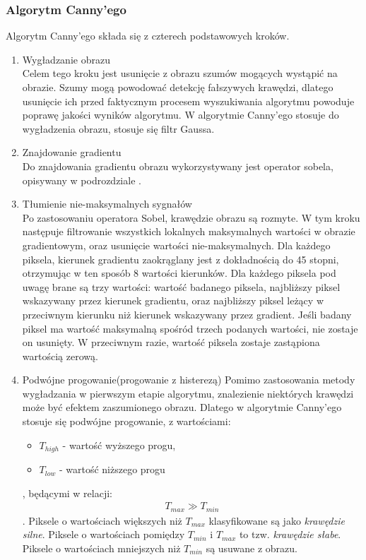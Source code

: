 \subsubsection{Algorytm Canny'ego}
Algorytm Canny'ego składa się z czterech podstawowych kroków.
\begin{enumerate}
\item Wygładzanie obrazu \\
  Celem tego kroku jest usunięcie z obrazu szumów mogących wystąpić na obrazie. Szumy mogą powodować detekcję fałszywych krawędzi, dlatego usunięcie ich przed faktycznym procesem wyszukiwania algorytmu powoduje poprawę jakości wyników algorytmu. W algorytmie Canny'ego stosuje do wygładzenia obrazu, stosuje się filtr Gaussa. 
\item Znajdowanie gradientu \\
  Do znajdowania gradientu obrazu wykorzystywany jest operator sobela, opisywany w podrozdziale .
\item Tłumienie nie-maksymalnych sygnałów \\
  Po zastosowaniu operatora Sobel, krawędzie obrazu są rozmyte. W tym kroku następuje filtrowanie wszystkich lokalnych maksymalnych wartości w obrazie gradientowym, oraz usunięcie wartości nie-maksymalnych. Dla każdego piksela, kierunek gradientu zaokrąglany jest z dokładnością do 45 stopni, otrzymując w ten sposób 8 wartości kierunków. Dla każdego piksela pod uwagę brane są trzy wartości: wartość badanego piksela, najbliższy piksel wskazywany przez kierunek gradientu, oraz najbliższy piksel leżący w przeciwnym kierunku niż kierunek wskazywany przez gradient. Jeśli badany piksel ma wartość maksymalną spośród trzech podanych wartości, nie zostaje on usunięty. W przeciwnym razie, wartość piksela zostaje zastąpiona wartością zerową.
\item Podwójne progowanie(progowanie z histerezą)
  Pomimo zastosowania metody wygładzania w pierwszym etapie algorytmu, znalezienie niektórych krawędzi może być efektem zaszumionego obrazu. Dlatego w algorytmie Canny'ego stosuje się podwójne progowanie, z wartościami:
\begin{itemize}
  \item \textit{$T_{high}$} - wartość wyższego progu,
  \item \textit{$T_{low}$} - wartość niższego progu
\end{itemize}, będącymi w relacji:
\begin{gather*}
  T_{max} \gg T_{min} 
\end{gather*}.
Piksele o wartościach większych niż \textit{$T_{max}$} klasyfikowane są jako \textit{krawędzie silne}. Piksele o wartościach pomiędzy \textit{$T_{min}$} i \textit{$T_{max}$} to tzw. \textit{krawędzie słabe}. Piksele o wartościach mniejszych niż \textit{$T_{min}$} są usuwane z obrazu.

\end{enumerate}

